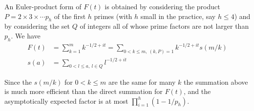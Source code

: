 \documentclass[conference,9pt]{IEEEtran}
\theoremstyle{definition}
\begin{document}
An Euler-product form of $F(t)$ is obtained by considering the product $P=2\times 3\times\cdots p_h$ of the first $h$ primes (with $h$ small in the practice, say $h\leq 4$) and by considering the set $Q$ of integers all of whose prime factors are not larger than $p_h$. We have
\begin{subequations}
    \begin{align*}
        F(t)&=\sum_{k=1}^m k^{-1/2+it}=\sum_{0<k\leq m,\ (k,P)=1}k^{-1/2+it}s(m/k)\\
        s(a)&=\sum_{0<l\leq a,\ l\in Q} l^{-1/2+it}
    \end{align*}
\end{subequations}

Since the $s(m/k)$ for $0<k\leq m$ are the same for many $k$ the summation above is much more efficient than the direct summation for $F(t)$, and the asymptotically expected factor is at most $\prod_{i=1}^h(1-1/p_h)$.



\end{document}
